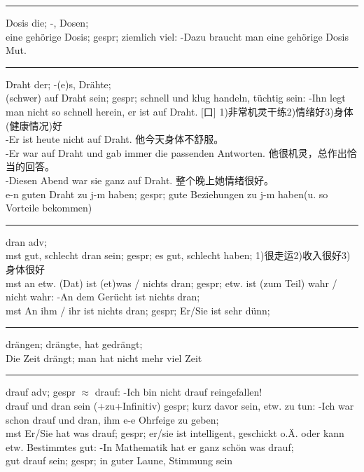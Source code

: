\noindent\rule{\textwidth}{1pt}
Dosis die; -, Dosen; \\
eine geh\"orige Dosis; gespr; ziemlich viel: -Dazu braucht man eine geh\"orige Dosis Mut. \\

\noindent\rule{\textwidth}{1pt}
Draht der; -(e)s, Dr\"ahte;\\
(schwer) auf Draht sein; gespr; schnell und klug handeln, t\"uchtig sein: -Ihn legt man nicht so schnell herein, er ist auf Draht. [口] 1)非常机灵干练2)情绪好3)身体(健康情况)好\\
-Er ist heute nicht auf Draht. 他今天身体不舒服。\\
-Er war auf Draht und gab immer die passenden Antworten. 他很机灵，总作出恰当的回答。\\
-Diesen Abend war sie ganz auf Draht. 整个晚上她情绪很好。\\
e-n guten Draht zu j-m haben; gespr; gute Beziehungen zu j-m haben(u. so Vorteile bekommen) \\

\noindent\rule{\textwidth}{1pt}
dran adv; \\
mst gut, schlecht dran sein; gespr; es gut, schlecht haben; 1)很走运2)收入很好3)身体很好\\
mst an etw. (Dat) ist (et)was / nichts dran; gespr; etw. ist (zum Teil) wahr / nicht wahr: -An dem Ger\"ucht ist nichts dran; \\
mst An ihm / ihr ist nichts dran; gespr; Er/Sie ist sehr d\"unn; \\

\noindent\rule{\textwidth}{1pt}
dr\"angen; dr\"angte, hat gedr\"angt; \\
Die Zeit dr\"angt; man hat nicht mehr viel Zeit \\

\noindent\rule{\textwidth}{1pt}
drauf adv; gespr $\approx$ drauf: -Ich bin nicht drauf reingefallen! \\
drauf und dran sein (+zu+Infinitiv) gespr; kurz davor sein, etw. zu tun: -Ich war schon drauf und dran, ihm e-e Ohrfeige zu geben; \\
mst Er/Sie hat was drauf; gespr; er/sie ist intelligent, geschickt o.\"A. oder kann etw. Bestimmtes gut: -In Mathematik hat er ganz sch\"on was drauf;\\
gut drauf sein; gespr; in guter Laune, Stimmung sein \\

